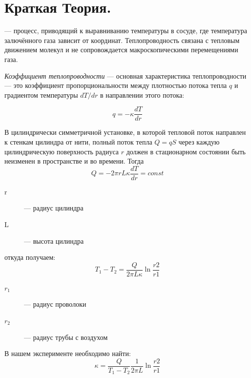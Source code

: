 \documentclass[a4paper,12pt]{article}
\begin{document}
\section{Краткая Теория.}
 --- процесс, приводящий к выравниванию температуры в сосуде, где температура залючённого газа зависит от координат. Теплопроводность связана с тепловым движением молекул и не сопровождается макроскопическими перемещениями газа. \par
{\it Коэффициент теплопроводности} --- основная характеристика теплопроводности --- это коэффициент пропорциональности между плотностью потока тепла $q$ и градиентом температуры $dT/dr$ в направлении этого потока:

\begin{equation}
  q = -\kappa \frac{dT}{dr}
\end{equation} \par

В цилиндрически симметричной установке, в которой тепловой поток направлен к стенкам цилиндра от нити, полный поток тепла $Q = qS$ через каждую цилиндрическую поверхность радиуса $r$ должен в стационарном состоянии быть неизменен в пространстве и во времени. Тогда
\begin{equation}
  Q = -2\pi r L \kappa \frac{dT}{dr} = const
\end{equation}
\begin{description}
  \item[r] --- радиус цилиндра
  \item[L] --- высота цилиндра
\end{description}

откуда получаем:
\begin{equation}
  T_1 - T_2 = \frac{Q}{2\pi L \kappa} \ln{\frac{r2}{r1}}
\end{equation}\par
\begin{description}
  \item[$r_1$] --- радиус проволоки
  \item[$r_2$] --- радиус трубы с воздухом
\end{description}

В нашем эксперименте необходимо найти:
\begin{equation}
  \kappa = \frac{Q}{T_1-T_2}\frac{1}{2\pi L}\ln\frac{r2}{r1}
\end{equation}
\end{document}
